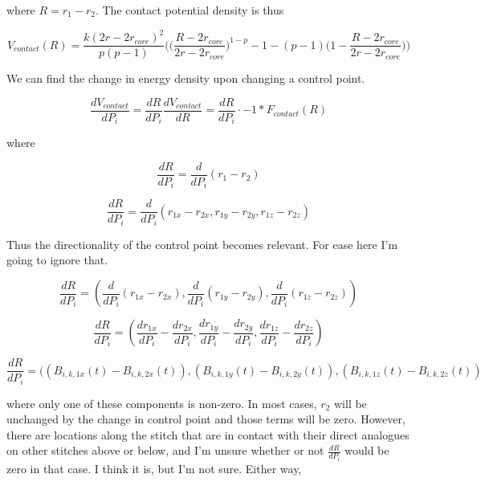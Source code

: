 \documentclass{article}
\begin{document}
\noindent
where $R=r_1-r_2$. The contact potential density is thus

\begin{equation}
    V_{contact}(R) = \frac{k(2r-2r_{core})^2}{p(p-1)}\bigg(\bigg(\frac{R-2r_{core}}{2r-2r_{core}}\bigg)^{1-p} -1 - (p-1)\bigg( 1 - \frac{R-2r_{core}}{2r-2r_{core}}\bigg) \bigg)
\end{equation}

We can find the change in energy density upon changing a control point.

\begin{equation}
    \frac{dV_{contact}}{dP_i} = \frac{dR}{dP_i}\frac{dV_{contact}}{dR} = \frac{dR}{dP_i} \cdot -1*F_{contact}(R)
\end{equation}

\noindent
where

\begin{equation}
    \frac{dR}{dP_i} = \frac{d}{dP_i} (r_1-r_2)
\end{equation}

\begin{equation}
    \frac{dR}{dP_i} = \frac{d}{dP_i} (r_{1x}-r_{2x}, r_{1y}-r_{2y}, r_{1z}-r_{2z})
\end{equation}

\noindent
Thus the directionality of the control point becomes relevant. For ease here I'm going to ignore that.

\begin{equation}
    \frac{dR}{dP_i} = (\frac{d}{dP_i}(r_{1x}-r_{2x}), \frac{d}{dP_i}(r_{1y}-r_{2y}), \frac{d}{dP_i}(r_{1z}-r_{2z}))
\end{equation}

\begin{equation}
    \frac{dR}{dP_i} = (\frac{dr_{1x}}{dP_i}-\frac{dr_{2x}}{dP_i}, \frac{dr_{1y}}{dP_i}-\frac{dr_{2y}}{dP_i},\frac{d r_{1z}}{dP_i}-\frac{dr_{2z}}{dP_i})
\end{equation}

\begin{equation}
    \frac{dR}{dP_i} = ((B_{i,k,1x}(t)-B_{i,k,2x}(t)), (B_{i,k,1y}(t)-B_{i,k,2y}(t)), (B_{i,k,1z}(t)-B_{i,k,2z}(t))
\end{equation}

\noindent
where only one of these components is non-zero. In most cases, $r_2$ will be unchanged by the change in control point and those terms will be zero. However, there are locations along the stitch that are in contact with their direct analogues on other stitches above or below, and I'm unsure whether or not $\frac{dR}{dP_i}$ would be zero in that case. I think it is, but I'm not sure. Either way,
\end{document}
